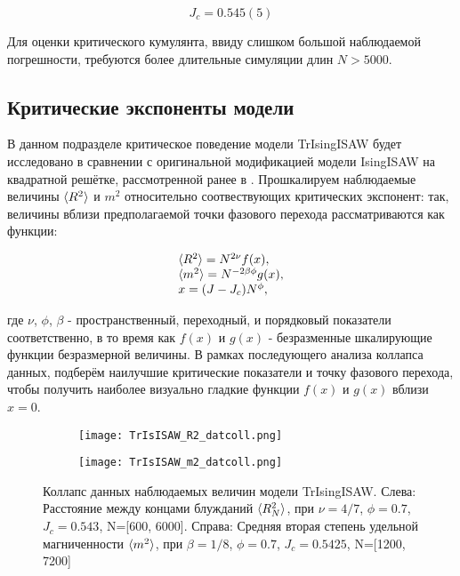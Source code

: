 \begin{equation}
\label{eq:TrIsISAW_Jc}
	J_c = 0.545(5)
\end{equation}

Для оценки критического кумулянта, ввиду слишком большой наблюдаемой погрешности, требуются более длительные симуляции длин $N > 5000$.


\newpage

\subsection{Критические экспоненты модели}

В данном подразделе критическое поведение модели TrIsingISAW будет исследовано в сравнении с оригинальной модификацией модели IsingISAW на квадратной решётке, рассмотренной ранее в \cite{faizullina2021critical}.
Прошкалируем наблюдаемые величины $\langle R^2 \rangle$ и $m^2$ относительно соотвествующих критических экспонент:
так, величины вблизи предполагаемой точки фазового перехода рассматриваются как функции:

\begin{equation}
\begin{array}{l}
\label{eq:TrIsISAW_datcoll}
\langle R^2 \rangle = N^{2\nu} f(x), \\
\langle m^2 \rangle = N^{-2\beta\phi} g(x), \\
x = (J-J_c) N^{\phi},
\end{array}
\end{equation}

где $\nu$, $\phi$, $\beta$  - пространственный, переходный, и порядковый показатели соответственно, в то время как $f(x)$ и $g(x)$ - безразменные шкалирующие функции безразмерной величины.
В рамках последующего анализа коллапса данных, подберём наилучшие критические показатели и точку фазового перехода, 
чтобы получить наиболее визуально гладкие функции $f(x)$ и $g(x)$ вблизи $x=0$.


\begin{figure}[h]
\begin{subfigure}{0.49\textwidth}
\texttt{[image: TrIsISAW\_R2\_datcoll.png]}
\caption{}
\label{fig:TrIsISAW_R2_datcoll}
\end{subfigure}
\hfill
\begin{subfigure}{0.49\textwidth}
\texttt{[image: TrIsISAW\_m2\_datcoll.png]}
\caption{}
\label{fig:TrIsISAW_m2_datcoll}
\end{subfigure}
\caption{Коллапс данных наблюдаемых величин модели TrIsingISAW.
Слева: Расстояние между концами блужданий $\langle R^2_N \rangle$, при $\nu = 4/7$, $\phi=0.7$, $J_c = 0.543$, N=[600, 6000].
Справа: Средняя вторая степень удельной магниченности $\langle m^2 \rangle$, при $\beta = 1/8$, $\phi=0.7$, $J_c = 0.5425$, N=[1200, 7200]}
\end{figure}

